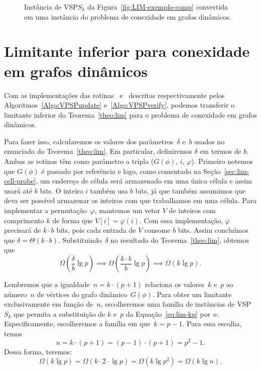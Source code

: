 \begin{figure}[htb]
\centering
\scalebox{.85}{

}
\caption{Instância de VSP$S_k$ da Figura~\ref{fig:LIM-exemplo-comp} convertida em uma instância do problema de conexidade em grafos dinâmicos.}
\label{fig:LIM-exemplo-verify}
\end{figure}

\section{Limitante inferior para conexidade em grafos dinâmicos}

Com as implementações das rotinas~\VPSPupdate{} e~\VPSPverify{} descritas respectivamente pelos Algoritmos~\ref{Algo:VPSPupdate} e~\ref{Algo:VPSPverify}, podemos transferir o limitante inferior do Teorema~\ref{theo:lim} para o problema de conexidade em grafos dinâmicos. 

Para fazer isso, calcularemos os valores dos parâmetros~$\delta$ e~$b$ usados no enunciado do Teorema~\ref{theo:lim}.
Em particular, definiremos  $\delta$ em termos de $b$. Ambas as rotinas têm como parâmetro a tripla ($G(\phi)$, $i$, $\varphi$). Primeiro notemos que $G(\phi)$ é passado por referência e logo, como comentado na Seção~\ref{sec:lim-cell-probe}, um endereço de célula será armazenado em uma única célula e assim usará até $b$ bits. O inteiro $i$ também usa $b$ bits, já que também assumimos que deva ser possível armazenar os inteiros com que trabalhamos em uma célula. Para implementar a permutação~$\varphi$, mantemos um vetor $V$ de inteiros com comprimento $k$ de forma que $V[i] = \varphi(i)$. Com essa implementação, $\varphi$ precisará de $k\cdot b$
bits, pois cada entrada de $V$ consome $b$ bits. Assim concluímos que $\delta = \Theta(k\cdot b)$.  Substituindo~$\delta$ no resultado do Teorema~\ref{theo:lim}, obtemos que
\begin{equation}
\Omega\left( \frac{\delta}{b}\lg p \right)\implies \Omega\left(\frac{k\cdot b}{b}\lg p\right)\implies \Omega(k\lg p).\label{eq:lim-kp}
\end{equation}

Lembremos que a igualdade~$n=k\cdot (p+1)$ relaciona os valores~$k$ e~$p$ ao número~$n$ de vértices do grafo dinâmico~$G(\phi)$. Para obter um limitante exclusivamente em função de~$n$, escolheremos uma família de instâncias de VSP$S_k$ que permita a substituição de $k$ e~$p$ da Equação~\eqref{eq:lim-kp} por $n$. Especificamente, escolheremos a família em que~$k = p-1$.
Para essa escolha, temos
$$
n =k\cdot (p+1) =(p-1)\cdot  (p+1) =p^2-1.
$$
Dessa forma, teremos:
$$
\Omega(k \lg p) = \Omega(k\cdot  2\cdot \lg p) = \Omega(k \lg p^2) = \Omega(k \lg n).\nonumber 
$$

